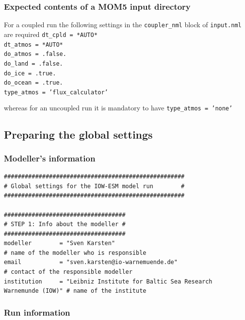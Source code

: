 \documentclass[a4paper,titlepage]{scrartcl}
\begin{document}
\subsubsection{Expected contents of a MOM5 input directory}
For a coupled run the following settings in the \texttt{coupler\_nml} block of \texttt{input.nml} are required
\texttt{dt\_cpld  = *AUTO*} \\
\texttt{dt\_atmos = *AUTO*} \\
\texttt{do\_atmos = .false.} \\
\texttt{do\_land = .false.} \\
\texttt{do\_ice = .true.} \\
\texttt{do\_ocean = .true.} \\
\texttt{type\_atmos = 'flux\_calculator'}

whereas for an uncoupled run it is mandatory to have
\texttt{type\_atmos = 'none'}

\subsection{Preparing the global settings}

\subsubsection{Modeller's information}
\begin{verbatim}
####################################################
# Global settings for the IOW-ESM model run        #
####################################################

###################################
# STEP 1: Info about the modeller #
###################################
modeller        = "Sven Karsten"                                               # name of the modeller who is responsible
email           = "sven.karsten@io-warnemuende.de"                             # contact of the responsible modeller
institution     = "Leibniz Institute for Baltic Sea Research Warnemunde (IOW)" # name of the institute
\end{verbatim}


\subsubsection{Run information}
\end{document}
